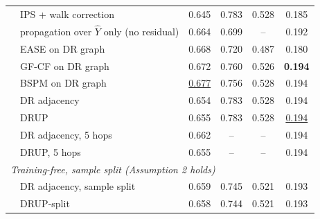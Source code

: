 \begin{tabular}{llcccc}
 & IPS + walk correction & 0.645 & 0.783 & 0.528 & 0.185\\
 & propagation over $\hat Y$ only (no residual) & 0.664 & 0.699 & -- & 0.192\\
 & EASE on DR graph & 0.668 & 0.720 & 0.487 & 0.180\\
 & GF-CF on DR graph & 0.672 & 0.760 & 0.526 & \textbf{0.194}\\
 & BSPM on DR graph & \underline{0.677} & 0.756 & 0.528 & 0.194\\
 & DR adjacency & 0.654 & 0.783 & 0.528 & 0.194\\
 & DRUP & 0.655 & 0.783 & 0.528 & \underline{0.194}\\
 & DR adjacency, 5 hops & 0.662 & -- & -- & 0.194\\
 & DRUP, 5 hops & 0.655 & -- & -- & 0.194\\
\multicolumn{6}{l}{\emph{Training-free, sample split (Assumption 2 holds)}}\\
 & DR adjacency, sample split & 0.659 & 0.745 & 0.521 & 0.193\\
 & DRUP-split & 0.658 & 0.744 & 0.521 & 0.193\\
\bottomrule
\end{tabular}
